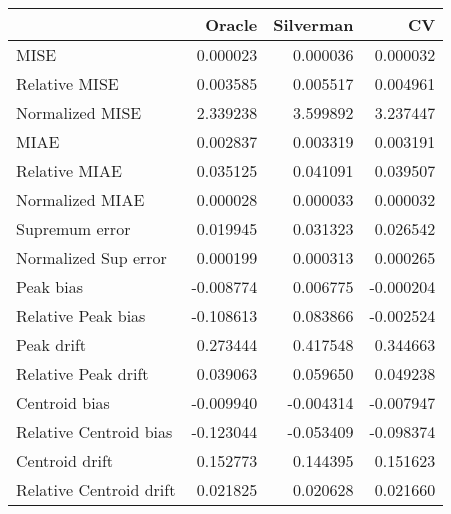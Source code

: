 \begin{tabular}{lrrr}
  \toprule
 & Oracle & Silverman & CV \\ 
  \midrule
MISE & 0.000023 & 0.000036 & 0.000032 \\ 
  Relative MISE & 0.003585 & 0.005517 & 0.004961 \\ 
  Normalized MISE & 2.339238 & 3.599892 & 3.237447 \\ 
  MIAE & 0.002837 & 0.003319 & 0.003191 \\ 
  Relative MIAE & 0.035125 & 0.041091 & 0.039507 \\ 
  Normalized MIAE & 0.000028 & 0.000033 & 0.000032 \\ 
  Supremum error & 0.019945 & 0.031323 & 0.026542 \\ 
  Normalized Sup error & 0.000199 & 0.000313 & 0.000265 \\ 
  Peak bias & -0.008774 & 0.006775 & -0.000204 \\ 
  Relative Peak bias & -0.108613 & 0.083866 & -0.002524 \\ 
  Peak drift & 0.273444 & 0.417548 & 0.344663 \\ 
  Relative Peak drift & 0.039063 & 0.059650 & 0.049238 \\ 
  Centroid bias & -0.009940 & -0.004314 & -0.007947 \\ 
  Relative Centroid bias & -0.123044 & -0.053409 & -0.098374 \\ 
  Centroid drift & 0.152773 & 0.144395 & 0.151623 \\ 
  Relative Centroid drift & 0.021825 & 0.020628 & 0.021660 \\ 
   \bottomrule
\end{tabular}
